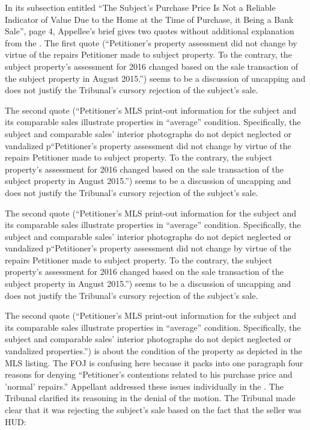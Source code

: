 \documentclass[12pt,\documentclassflag]{michiganCourtOfAppealsBrief}
\begin{document}
In its subsection entitled ``The Subject's Purchase Price Is Not a
Reliable Indicator of Value Due to the Home at the Time of Purchase,
it Being a Bank Sale'', page 4, Appellee's brief gives two quotes without additional explanation from the \foj[5]. The first quote
(``Petitioner's property assessment did not change by virtue of the
repairs Petitioner made to subject property. To the contrary, the
subject property's assessment for 2016 changed based on the sale
transaction of the subject property in August 2015.'') seems to be a discussion of uncapping and does not justify the Tribunal's cursory rejection of the subject's sale.

The second quote (``Petitioner's MLS print-out information for the subject and its comparable sales illustrate properties in ``average'' condition.
Specifically, the subject and comparable sales' interior photographs
do not depict neglected or vandalized p``Petitioner's property assessment did not change by virtue of the
repairs Petitioner made to subject property. To the contrary, the
subject property's assessment for 2016 changed based on the sale
transaction of the subject property in August 2015.'') seems to be a discussion of uncapping and does not justify the Tribunal's cursory rejection of the subject's sale.

The second quote (``Petitioner's MLS print-out information for the subject and its comparable sales illustrate properties in ``average'' condition.
Specifically, the subject and comparable sales' interior photographs
do not depict neglected or vandalized p``Petitioner's property assessment did not change by virtue of the
repairs Petitioner made to subject property. To the contrary, the
subject property's assessment for 2016 changed based on the sale
transaction of the subject property in August 2015.'') seems to be a discussion of uncapping and does not justify the Tribunal's cursory rejection of the subject's sale.

The second quote (``Petitioner's MLS print-out information for the subject and its comparable sales illustrate properties in ``average'' condition.
Specifically, the subject and comparable sales' interior photographs
do not depict neglected or vandalized properties.'') is about the condition of the property as depicted in the MLS listing.
The FOJ is confusing here because it packs into one paragraph four reasons for denying ``Petitioner's contentions related to his purchase price and 'normal' repairs.'' Appellant addressed these issues individually in the \motionForReconsideration[4-5]. The Tribunal clarified its reasoning in the denial of the motion. The Tribunal made clear that it was rejecting the subject's sale based on the fact that the seller was HUD:
\end{document}
